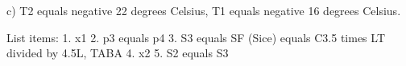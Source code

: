 c) T2 equals negative 22 degrees Celsius, T1 equals negative 16 degrees Celsius.

List items:
1. x1
2. p3 equals p4
3. S3 equals SF (Sice) equals C3.5 times LT divided by 4.5L, TABA
4. x2
5. S2 equals S3